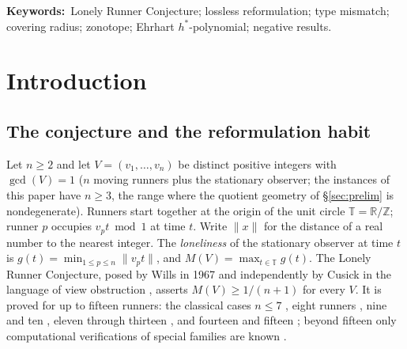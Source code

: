 \documentclass[11pt,a4paper]{article}
\numberwithin{equation}{section}
\theoremstyle{plain}
\theoremstyle{definition}
\theoremstyle{remark}
\newcommand{\Z}{\mathbb{Z}}
\newcommand{\R}{\mathbb{R}}
\newcommand{\T}{\mathbb{T}}
\newcommand{\wnc}[1]{\lVert #1 \rVert}
\newcommand{\lrc}{\mathrm{LRC}}
\begin{document}
\begin{abstract}
archive with a certification ladder: exact deepest-hole classification at
$n=3$, away-certified and branch-and-bound certificates at $n=4$
($\rho=9/34$ at $v=(1,2,3,16)$), exact refutations at $n=5,6$ (the
sharpest two-sided), and certified deepest-hole equality at $n=5$,
$m=10,20,25,30$ ($\rho=\delta$ exactly). Every number is re-asserted by
a persisted, independent, exact computation, and the certification
method carries a negative control that correctly refuses a false
statement.
The paper is a negative-results paper and claims no progress on the
conjecture itself: it proves no new cases of $\lrc$, and the surviving
equivalent forms are as hard as they ever were. Its contribution is the
obstruction's anatomy---why four natural toolkits, each correct and each
productive on its own terms, cannot cross the same gap.
\end{abstract}

\noindent\textbf{Keywords:}\ Lonely Runner Conjecture; lossless
reformulation; type mismatch; covering radius; zonotope; Ehrhart
$h^*$-polynomial; negative results.

\section{Introduction}\label{sec:intro}

\subsection{The conjecture and the reformulation habit}

Let $n\ge 2$ and let $V=(v_1,\dots,v_n)$ be distinct positive integers
with $\gcd(V)=1$ ($n$ moving runners plus the stationary observer; the
instances of this paper have $n\ge 3$, the range where the quotient
geometry of \S\ref{sec:prelim} is nondegenerate). Runners start together
at the origin of the unit circle
$\T=\R/\Z$; runner $p$ occupies $v_p t \bmod 1$ at time $t$. Write
$\wnc{x}$ for the distance of a real number to the nearest integer. The
\emph{loneliness} of the stationary observer at time $t$ is
$g(t)=\min_{1\le p\le n}\wnc{v_p t}$, and $M(V)=\max_{t\in\T}g(t)$. The
Lonely Runner Conjecture, posed by Wills in 1967 and independently by
Cusick in the language of view obstruction
\cite{PS-survey,Wills,Cusick1973}, asserts $M(V)\ge 1/(n{+}1)$ for every
$V$. It is proved for up to fifteen runners: the classical cases
$n\le7$ \cite{PS-survey}, eight runners \cite{Rosenfeld8}, nine and ten
\cite{Trakulthongchai}, eleven through thirteen \cite{Sungkawichai}, and
fourteen and fifteen \cite{Allikvere}; beyond fifteen only computational
verifications of special families are known
\cite{PS-survey,MSS}.
\end{document}
